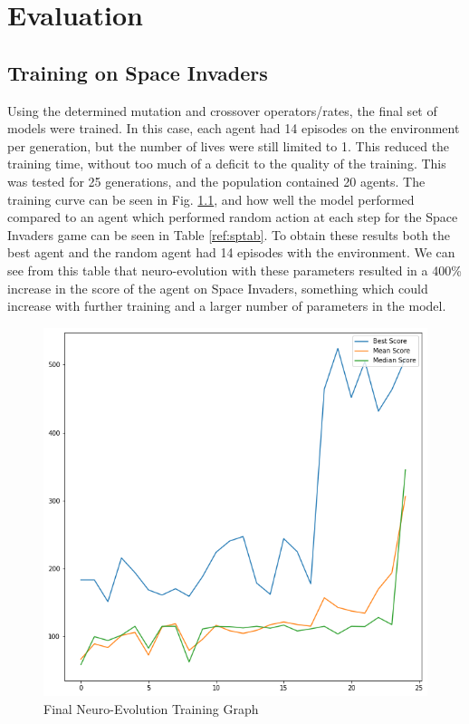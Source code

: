 \chapter{Evaluation}

\label{ch:eval}

\section{Training on Space Invaders}

Using the determined mutation and crossover operators/rates, the final set of models were trained. In this case, each agent had 14 episodes on the environment per generation, but the number of lives were still limited to 1. This reduced the training time, without too much of a deficit to the quality of the training.  This was tested for 25 generations, and the population contained 20 agents. The training curve can be seen in Fig. \ref{fig:final}, and how well the model performed compared to an agent which performed random action at each step for the Space Invaders game can be seen in Table \ref{ref:sptab}. To obtain these results both the best agent and the random agent had 14 episodes with the environment. We can see from this table that neuro-evolution with these parameters resulted in a 400\% increase in the score of the agent on Space Invaders, something which could increase with further training and a larger number of parameters in the model.

\begin{figure}[ht]
  \centering
  \includegraphics[scale=0.4]{images/final-run.png}
  \caption{Final Neuro-Evolution Training Graph}
  \label{fig:final}
\end{figure}

